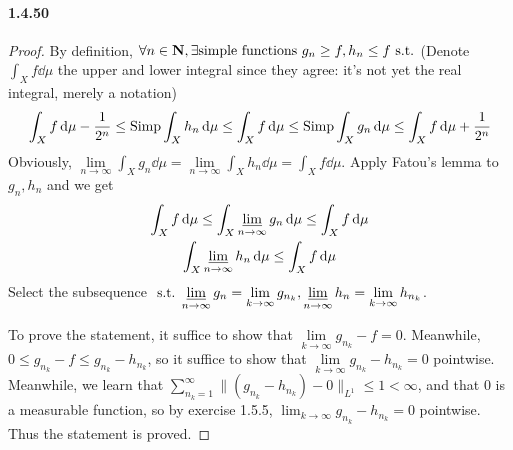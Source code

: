 \documentclass{article}
\begin{document}
\paragraph{1.4.50}
\begin{proof}
By definition, $\forall n\in\mathbf{N},\exists\text{simple functions } g_n\geq f,h_n\leq f\text{ s.t.}$ (Denote $\int_{X}f\dd\mu$ the upper and lower integral since they agree: it's not yet the real integral, merely a notation)
\[\int_{X}f\,\mathrm{d}\mu-\frac{1}{2^n}\leq\mathrm{Simp}\int_{X}h_n\,\mathrm{d}\mu\leq\int_{X}f\,\mathrm{d}\mu\leq\mathrm{Simp}\int_{X}g_n\,\mathrm{d}\mu\leq\int_{X}f\,\mathrm{d}\mu+\frac{1}{2^n}\]
Obviously, $\lim\limits_{n\to\infty}\int_{X}g_n\dd\mu=\lim\limits_{n\to\infty}\int_{X}h_n\dd\mu=\int_{X}f\dd\mu$. Apply Fatou's lemma to $g_n, h_n$ and we get
\begin{gather*}
\int_{X}f\,\mathrm{d}\mu\leq\int_{X}\varliminf_{n\to\infty}g_n\,\mathrm{d}\mu\leq\int_{X}f\,\mathrm{d}\mu\\
\int_{X}\varliminf_{n\to\infty}h_n\,\mathrm{d}\mu\leq\int_{X}f\,\mathrm{d}\mu
\end{gather*}
Select the subsequence $\text{ s.t.}$ $\varliminf\limits_{n\to\infty}g_n=\lim\limits_{k\to\infty}g_{n_k},\varliminf\limits_{n\to\infty}h_n=\lim\limits_{k\to\infty}h_{n_k}$.

To prove the statement, it suffice to show that $\lim\limits_{k\to\infty}g_{n_k}-f=0$. Meanwhile, $0\leq g_{n_k}-f\leq g_{n_k}-h_{n_k}$, so it suffice to show that $\lim\limits_{k\to\infty}g_{n_k}-h_{n_k}=0$ pointwise. Meanwhile, we learn that $\sum\limits_{n_k=1}^{\infty}\|(g_{n_k}-h_{n_k})-0\|_{L^1}\leq 1<\infty$, and that $0$ is a measurable function, so by exercise 1.5.5, $\lim_{k\to\infty}g_{n_k}-h_{n_k}=0$ pointwise. Thus the statement is proved.
\end{proof}
\end{document}

